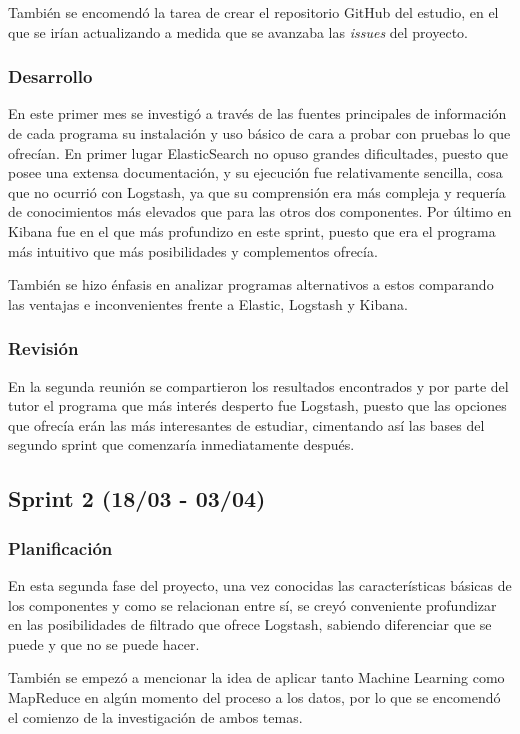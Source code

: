 También se encomendó la tarea de crear el repositorio GitHub del estudio, en el que se irían actualizando a medida que se avanzaba las \textit{issues} del proyecto.

\subsubsection{Desarrollo}
En este primer mes se investigó a través de las fuentes principales de información de cada programa su instalación y uso básico de cara a probar con pruebas lo que ofrecían. En primer lugar ElasticSearch no opuso grandes dificultades, puesto que posee una extensa documentación, y su ejecución fue relativamente sencilla, cosa que no ocurrió con Logstash, ya que su comprensión era más compleja y requería de conocimientos más elevados que para las otros dos componentes. Por último en Kibana fue en el que más profundizo en este sprint, puesto que era el programa más intuitivo que más posibilidades y complementos ofrecía.

También se hizo énfasis en analizar programas alternativos a estos comparando las ventajas e inconvenientes frente a Elastic, Logstash y Kibana.

\subsubsection{Revisión}
En la segunda reunión se compartieron los resultados encontrados y por parte del tutor el programa que más interés desperto fue Logstash, puesto que las opciones que ofrecía erán las más interesantes de estudiar, cimentando así las bases del segundo sprint que comenzaría inmediatamente después.

\subsection{Sprint 2 (18/03 - 03/04)}
\subsubsection{Planificación}
En esta segunda fase del proyecto, una vez conocidas las características básicas de los componentes y como se relacionan entre sí, se creyó conveniente profundizar en las posibilidades de filtrado que ofrece Logstash, sabiendo diferenciar que se puede y que no se puede hacer.

También se empezó a mencionar la idea de aplicar tanto Machine Learning como MapReduce en algún momento del proceso a los datos, por lo que se encomendó el comienzo de la investigación de ambos temas.

